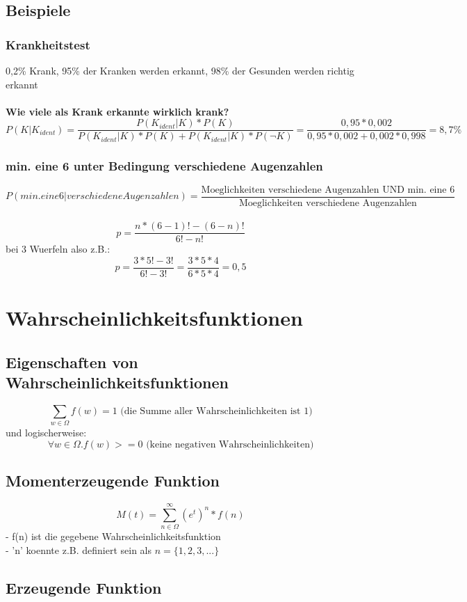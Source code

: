 \documentclass{article}
\begin{document}
	\subsection{Beispiele}
	\subsubsection{Krankheitstest}
	0,2\% Krank, 95\% der Kranken werden erkannt, 98\% der Gesunden werden richtig erkannt\\ \\
	\textbf{Wie viele als Krank erkannte wirklich krank?}\\
	\[
		P(K | K_{ident} ) = \frac{P(K_{ident}|K)*P(K)}
								{P(K_{ident}|K)*P(K)+P(K_{ident}|K)*P(\neg K)} =
									\frac{0,95*0,002}{0,95*0,002+0,002*0,998} = 8,7\%
	\]
	\subsubsection{min. eine 6 unter Bedingung verschiedene Augenzahlen}
	\[
		P(min. eine 6|verschiedene Augenzahlen) = \frac{\text{Moeglichkeiten verschiedene Augenzahlen UND min. eine 6}}{\text{Moeglichkeiten verschiedene Augenzahlen}}
	\]\\
	\[
		p=\frac{n*(6-1)!-(6-n)!}{6!-n!} 
	\]
	bei 3 Wuerfeln also z.B.:\[
		p=\frac{3*5!-3!}{6!-3!} = \frac{3*5*4}{6*5*4} = 0,5
	\]
	
	\section{Wahrscheinlichkeitsfunktionen}
	\subsection{Eigenschaften von Wahrscheinlichkeitsfunktionen}
	\[ \sum_{w \in \Omega} f(w) = 1 \text{ (die Summe aller Wahrscheinlichkeiten ist 1)}\]
	und logischerweise:
	\[ \forall w\in\Omega . f(w)>=0 \text{ (keine negativen Wahrscheinlichkeiten)} \]
	\subsection{Momenterzeugende Funktion}
	\[
		M(t)=\sum_{n\in\Omega}^{\infty}(e^t)^n * f(n)
	\]
	- f(n) ist die gegebene Wahrscheinlichkeitsfunktion\\
	- 'n' koennte z.B. definiert sein als $n=\{1,2,3,...\}$
	\subsection{Erzeugende Funktion}
\end{document}
